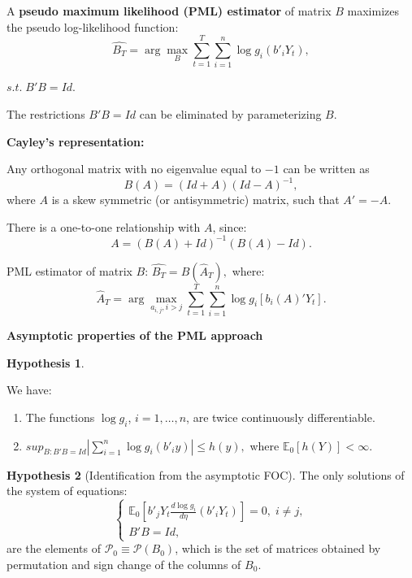 \documentclass[
]{book}
\providecommand{\tightlist}{%
  \setlength{\itemsep}{0pt}\setlength{\parskip}{0pt}}
\theoremstyle{definition}
\theoremstyle{definition}
\theoremstyle{definition}
\theoremstyle{definition}
\newtheorem{hypothesis}{Hypothesis}[chapter]
\theoremstyle{remark}
\begin{document}
A \textbf{pseudo maximum likelihood (PML) estimator} of matrix \(B\) maximizes the pseudo log-likelihood function:
\begin{equation}
\widehat{B_T} = \arg \max_B \sum^T_{t=1} \sum^n_{i=1} \log g_i (b'_i Y_t),\label{eq:optimprob}
\end{equation}

\centerline{$s.t. \;B'B = Id.$}

The restrictions \(B'B = Id\) can be eliminated by parameterizing \(B\).

\textbf{Cayley's representation:}

Any orthogonal matrix with no eigenvalue equal to \(-1\) can be written as
\begin{equation}
B(A) = (Id+A) (Id-A)^{-1},
\end{equation}
where \(A\) is a skew symmetric (or antisymmetric) matrix, such that \(A'=-A\).

There is a one-to-one relationship with \(A\), since:
\begin{equation}
A = (B(A)+Id)^{-1} (B(A)-Id).
\end{equation}

PML estimator of matrix \(B\): \(\widehat{B_T} = B(\hat{A}_T),\) where:
\begin{equation}
\hat{A}_T = \arg \max_{a_{i,j}, i>j} \sum^T_{t=1} \sum^n_{i=1} \log g_i [b_i (A)' Y_t].\label{eq:optimprob2}
\end{equation}

\textbf{Asymptotic properties of the PML approach}

\begin{hypothesis}
\protect\hypertarget{hyp:NonGauss2}{}\label{hyp:NonGauss2}

We have:

\begin{enumerate}
\def\labelenumi{\roman{enumi}.}
\tightlist
\item
  The functions \(\log g_i\), \(i=1,\ldots,n\), are twice continuously differentiable.
\item
  \(sup_{B: B'B = Id} \left|\sum^n_{i=1} \log g_i (b'_i y)\right| \leq h(y),\) where \(\mathbb{E}_0 [h (Y)] < \infty\).
\end{enumerate}

\end{hypothesis}

\begin{hypothesis}[Identification from the asymptotic FOC]
\protect\hypertarget{hyp:NonGauss3}{}\label{hyp:NonGauss3}The only solutions of the system of equations:
\[
\left\{
\begin{array}{l} \mathbb{E}_0 \left[b'_j Y_t \frac{d\log g_i}{d\eta} (b'_i Y_t)\right] = 0,\;  i \neq j, \\
B' B = Id,
\end{array}
\right.
\]
are the elements of \(\mathcal{P}_0 \equiv \mathcal{P}(B_0)\), which is the set of matrices obtained by permutation and sign change of the columns of \(B_0\).
\end{hypothesis}
\end{document}
